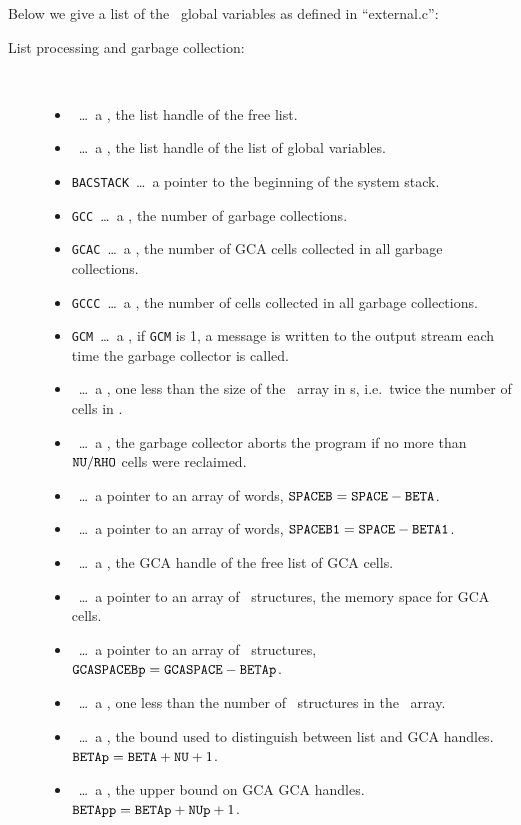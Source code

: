 Below we give a list of the \saclib\ global variables as defined in
``external.c'':
\begin{description}
\item[List processing and garbage collection:] \ \
  \begin{itemize}
  \item \AVAIL\ \ldots\ a \Word, the list handle of the free list.
  \item \GCGLOBALS\ \ldots\ a \Word, the list handle of the list of global
    variables.
  \item {\tt BACSTACK}\ \ldots\ a pointer to the beginning of the system
    stack.
  \item {\tt GCC}\ \ldots\ a \Word, the number of garbage collections.
  \item {\tt GCAC}\ \ldots\ a \Word, the number of GCA cells collected in
    all garbage collections.
  \item {\tt GCCC}\ \ldots\ a \Word, the number of cells collected in all
    garbage collections.
  \item {\tt GCM}\ \ldots\ a \Word, if {\tt GCM} is 1, a message is written
    to the output stream each time the garbage collector is called.
  \item \NU\ \ldots\ a \Word, one less than the size of the \SPACE\ array
    in \Word s, i.e.\ twice the number of cells in \SPACE.
  \item \RHO\ \ldots\ a \Word, the garbage collector aborts the program
    if no more than ${\tt NU}/{\tt RHO}$ cells were reclaimed.
  \item \SPACEB \ \ldots\ a pointer to an array of words, ${\tt SPACEB} = {\tt SPACE}
    - {\tt BETA}$.
  \item \SPACEBone \ \ldots\ a pointer to an array of words, ${\tt SPACEB1} =
    {\tt SPACE} - {\tt BETA1}$.
  \item \GCAAVAIL \ \ldots\ a \Word, the GCA handle of the free list of GCA
    cells.
  \item \GCASPACE \ \ldots\ a pointer to an array of \GCArray\ structures,
    the memory space for GCA cells.
  \item \GCASPACEBp \ \ldots\ a pointer to an array of \GCArray\
    structures, ${\tt GCASPACEBp} = {\tt GCASPACE} - {\tt BETAp}$.
  \item \NUp \ \ldots\ a \Word, one less than the number of \GCArray\
    structures in the \GCASPACE\ array.
  \item \BETAp \ \ldots\ a \Word, the bound used to distinguish between
    list and GCA handles. ${\tt BETAp} = {\tt BETA} + {\tt NU} + 1$.
  \item \BETApp \ \ldots\ a \Word, the upper bound on GCA GCA handles.
    ${\tt BETApp} = {\tt BETAp} + {\tt NUp} + 1$.
  \end{itemize}


\end{description}

